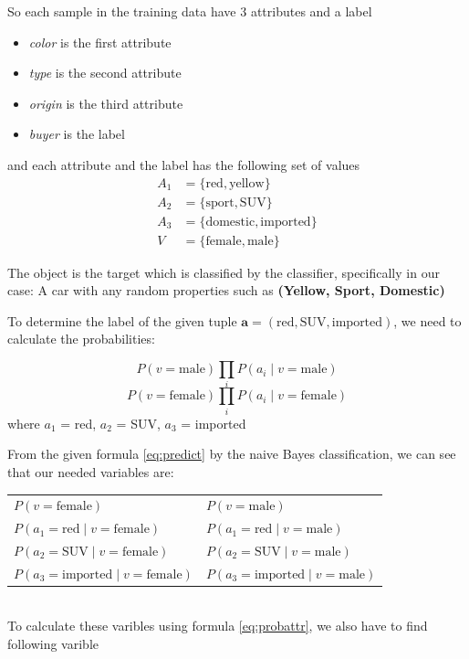 \documentclass[a4paper]{article}
\renewcommand{\vec}[1]{\mathbf{#1}}
\begin{document}
		So each sample in the training data have 3 attributes and a label
		\begin{itemize}
			\item \textit{color} is the first attribute
			\item \textit{type} is the second attribute
			\item \textit{origin} is the third attribute
			\item \textit{buyer} is the label
		\end{itemize}

		and each attribute and the label has the following set of values
		\begin{align*}
			A_1 &= \{\text{red},      \text{yellow}\} \\
			A_2 &= \{\text{sport},    \text{SUV}\} \\
			A_3 &= \{\text{domestic}, \text{imported}\} \\
			V   &= \{\text{female},   \text{male}\}
		\end{align*}

		The object is the target which is classified by the classifier,
		specifically in our case: A car with any random properties such
		as \textbf{(Yellow, Sport, Domestic)}

		To determine the label of the given tuple $\vec{a}=(\text{red},
		\text{SUV}, \text{imported})$, we need to calculate the
		probabilities:

		\[P(v=\text{male})   \prod_i{P(a_i \mid v=\text{male}  )}\]
		\[P(v=\text{female}) \prod_i{P(a_i \mid v=\text{female})}\]
		where $a_1$ = red, $a_2$ = SUV, $a_3$ = imported

		From the given formula \eqref{eq:predict} by the naive Bayes
		classification, we can see that our needed variables are:\\

		{
			\centering
			\begin{tabular}{ll}
			$P(v=\text{female})$ & $P(v=\text{male})$ \\
			$P(a_1=\text{red}\mid v=\text{female})$ &
			$P(a_1=\text{red}\mid v=\text{male})$ \\
			$P(a_2=\text{SUV}\mid v=\text{female})$ &
			$P(a_2=\text{SUV}\mid v=\text{male})$ \\
			$P(a_3=\text{imported}\mid v=\text{female})$ &
			$P(a_3=\text{imported}\mid v=\text{male})$
			\end{tabular}
		}\\

		To calculate these varibles using formula \eqref{eq:probattr},
		we also have to find following varible\\
\end{document}
